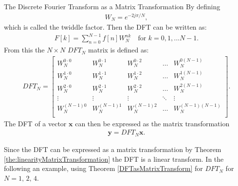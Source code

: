\begin{theorem}{The Discrete Fourier Transform as a Matrix Transformation}
    By defining
    \begin{align*}
        W_N=e^{-2j\pi/N},
    \end{align*}
    which is called the twiddle factor. Then the DFT can be written as:
    \begin{align*}
        F[k]=\sum^{N-1}_{n=0}f[n]W_N^{nk}\quad \text{for } k=0, 1,...  N-1.
    \end{align*}
    From this the $N\times N$ $DFT_N$ matrix is defined as:
    \begin{align*}
        DFT_N=
        \begin{bmatrix}
             W_N^{0\cdot0} & W_N^{0\cdot1} & W_N^{0\cdot2} & \hdots & W_N^{0(N-1)} \\
             W_N^{1\cdot0} & W_N^{1\cdot1} & W_N^{1\cdot2} & \hdots & W_N^{1(N-1)} \\
             W_N^{2\cdot 0} & W_N^{2\cdot1} & W_N^{2\cdot2} & \hdots & W_N^{2(N-1)} \\
             \vdots & \vdots & \vdots & \ddots & \vdots \\
             W_N^{(N-1)0} & W_N^{(N-1)1} & W_N^{(N-1)2} & \hdots & W_N^{(N-1)(N-1)} \\
         \end{bmatrix}.
    \end{align*}
    The DFT of a vector $\textbf{x}$ can then be expressed as the matrix transformation
    \begin{align*}
        \textbf{y}=DFT_N\textbf{x}.
    \end{align*}
    \cite[10]{rao2011fast}
    \label{DFTasMatrixTransform}
\end{theorem}
Since the DFT can be expressed as a matrix transformation by Theorem \ref{the:linearityMatrixTransformation} the DFT is a linear transform.
\noindent In the following an example, using Theorem \ref{DFTasMatrixTransform} for $DFT_N$ for $N=1,\,2,\,4$.
